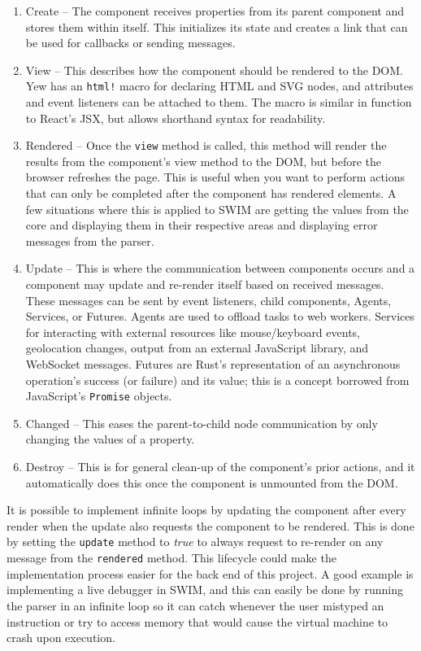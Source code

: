 \documentclass[
    paper=letter,
    parskip=half,
    fontsize=12pt,
    titlepage=firstiscover,
    toc=bibliography,
    numbers=endperiod
]{scrartcl}
\providecommand{\tightlist}{%
  \setlength{\itemsep}{0pt}\setlength{\parskip}{0pt}}
\begin{document}
\begin{enumerate}
    \tightlist
    \item Create -- The component receives properties from its parent component
          and stores them within itself. This initializes its state and creates a
          link that can be used for callbacks or sending messages.
    \item View -- This describes how the component should be rendered to the DOM.
          Yew has an \texttt{html!} macro for declaring HTML and SVG nodes, and
          attributes and event listeners can be attached to them. The macro is
          similar in function to React's JSX, but allows shorthand syntax for
          readability.
    \item Rendered -- Once the \texttt{view} method is called, this method will
          render the results from the component's view method to the DOM, but
          before the browser refreshes the page. This is useful when you want to
          perform actions that can only be completed after the component has
          rendered elements. A few situations where this is applied to SWIM are
          getting the values from the core and displaying them in their respective
          areas and displaying error messages from the parser.
    \item Update -- This is where the communication between components occurs and
          a component may update and re-render itself based on received messages.
          These messages can be sent by event listeners, child components, Agents,
          Services, or Futures. Agents are used to offload tasks to web workers.
          Services for interacting with external resources like mouse/keyboard
          events, geolocation changes, output from an external JavaScript library,
          and WebSocket messages. Futures are Rust's representation of an
          asynchronous operation's success (or failure) and its value; this is a
          concept borrowed from JavaScript's \texttt{Promise} objects.
    \item Changed -- This eases the parent-to-child node communication by only
          changing the values of a property.
    \item Destroy -- This is for general clean-up of the component's prior
          actions, and it automatically does this once the component is unmounted
          from the DOM.
\end{enumerate}

It is possible to implement infinite loops by updating the component
after every render when the update also requests the component to be
rendered. This is done by setting the \texttt{update} method to {\em
        true} to always request to re-render on any message from the
\texttt{rendered} method. This lifecycle could make the implementation
process easier for the back end of this project. A good example is
implementing a live debugger in SWIM, and this can easily be done by
running the parser in an infinite loop so it can catch whenever the user
mistyped an instruction or try to access memory that would cause the
virtual machine to crash upon execution.
\end{document}
